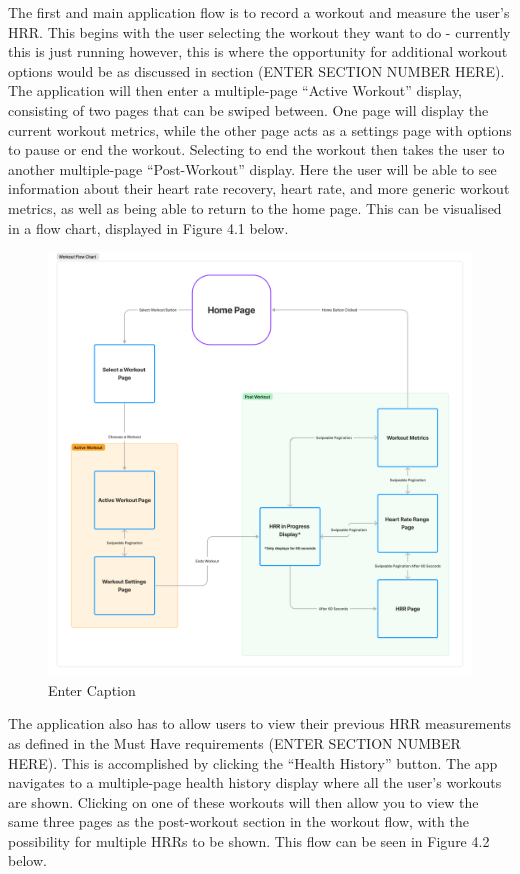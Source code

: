 \documentclass{l4proj}
\begin{document}
The first and main application flow is to record a workout and measure the user’s HRR. This begins with the user selecting the workout they want to do - currently this is just running however, this is where the opportunity for additional workout options would be as discussed in section (ENTER SECTION NUMBER HERE). The application will then enter a multiple-page “Active Workout” display, consisting of two pages that can be swiped between. One page will display the current workout metrics, while the other page acts as a settings page with options to pause or end the workout. Selecting to end the workout then takes the user to another multiple-page “Post-Workout” display. Here the user will be able to see information about their heart rate recovery, heart rate, and more generic workout metrics, as well as being able to return to the home page. This can be visualised in a flow chart, displayed in Figure 4.1 below.

\begin{figure}[h!]
    \centering
    \includegraphics[width=0.75\linewidth]{dissertation//dissImages/WorkoutFlow.pdf}
    \caption{Enter Caption}
    \label{fig:enter-label}
\end{figure}

The application also has to allow users to view their previous HRR measurements as defined in the Must Have requirements (ENTER SECTION NUMBER HERE). This is accomplished by clicking the “Health History” button. The app navigates to a multiple-page health history display where all the user’s workouts are shown. Clicking on one of these workouts will then allow you to view the same three pages as the post-workout section in the workout flow, with the possibility for multiple HRRs to be shown. This flow can be seen in Figure 4.2 below.
\end{document}

